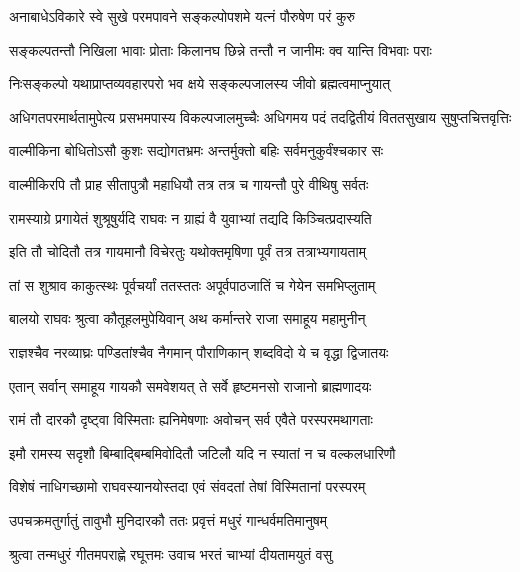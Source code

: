\twolineshloka
{अनाबाधेऽविकारे स्वे सुखे परमपावने}
{सङ्कल्पोपशमे यत्नं पौरुषेण परं कुरु} %

\twolineshloka
{सङ्कल्पतन्तौ निखिला भावाः प्रोताः किलानघ}
{छिन्ने तन्तौ न जानीमः क्व यान्ति विभवाः पराः} %

\twolineshloka
{निःसङ्कल्पो यथाप्राप्तव्यवहारपरो भव}
{क्षये सङ्कल्पजालस्य जीवो ब्रह्मत्वमाप्नुयात्} %

\twolineshloka
{अधिगतपरमार्थतामुपेत्य प्रसभमपास्य विकल्पजालमुच्चैः}
{अधिगमय पदं तदद्वितीयं विततसुखाय सुषुप्तचित्तवृत्तिः} %






\twolineshloka
{वाल्मीकिना बोधितोऽसौ कुशः सद्योगतभ्रमः}
{अन्तर्मुक्तो बहिः सर्वमनुकुर्वंश्चकार सः} %

\twolineshloka
{वाल्मीकिरपि तौ प्राह सीतापुत्रौ महाधियौ}
{तत्र तत्र च गायन्तौ पुरे वीथिषु सर्वतः} %

\twolineshloka
{रामस्याग्रे प्रगायेतं शुश्रूषुर्यदि राघवः}
{न ग्राह्यं वै युवाभ्यां तद्यदि किञ्चित्प्रदास्यति} %

\twolineshloka
{इति तौ चोदितौ तत्र गायमानौ विचेरतुः}
{यथोक्तमृषिणा पूर्वं तत्र तत्राभ्यगायताम्} %

\twolineshloka
{तां स शुश्राव काकुत्स्थः पूर्वचर्यां ततस्ततः}
{अपूर्वपाठजातिं च गेयेन समभिप्लुताम्} %

\twolineshloka
{बालयो राघवः श्रुत्वा कौतूहलमुपेयिवान्}
{अथ कर्मान्तरे राजा समाहूय महामुनीन्} %

\twolineshloka
{राज्ञश्चैव नरव्याघ्रः पण्डितांश्चैव नैगमान्}
{पौराणिकान् शब्दविदो ये च वृद्धा द्विजातयः} %

\twolineshloka
{एतान् सर्वान् समाहूय गायकौ समवेशयत्}
{ते सर्वे हृष्टमनसो राजानो ब्राह्मणादयः} %

\twolineshloka
{रामं तौ दारकौ दृष्ट्वा विस्मिताः ह्यनिमेषणाः}
{अवोचन् सर्व एवैते परस्परमथागताः} %

\twolineshloka
{इमौ रामस्य सदृशौ बिम्बाद्बिम्बमिवोदितौ}
{जटिलौ यदि न स्यातां न च वल्कलधारिणौ} %

\twolineshloka
{विशेषं नाधिगच्छामो राघवस्यानयोस्तदा}
{एवं संवदतां तेषां विस्मितानां परस्परम्} %

\twolineshloka
{उपचक्रमतुर्गातुं तावुभौ मुनिदारकौ}
{ततः प्रवृत्तं मधुरं गान्धर्वमतिमानुषम्} %

\twolineshloka
{श्रुत्वा तन्मधुरं गीतमपराह्णे रघूत्तमः}
{उवाच भरतं चाभ्यां दीयतामयुतं वसु} %

